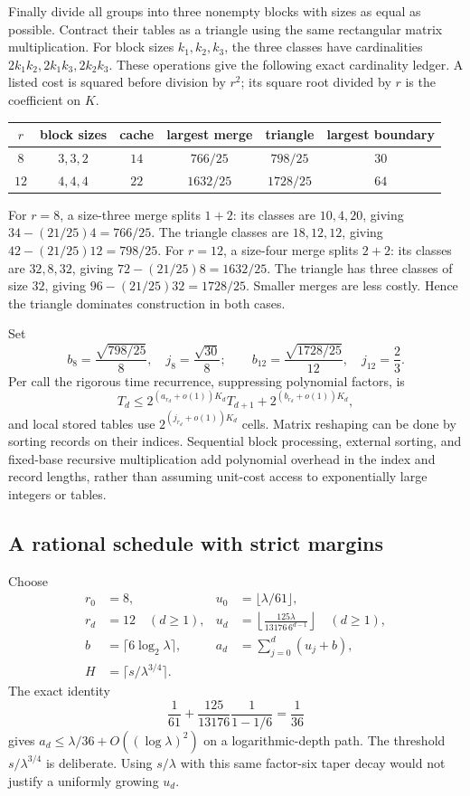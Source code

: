 Finally divide all groups into three nonempty blocks with sizes as equal as possible. Contract their tables as a triangle using the same rectangular matrix multiplication. For block sizes $k_1,k_2,k_3$, the three classes have cardinalities $2k_1k_2,2k_1k_3,2k_2k_3$. These operations give the following exact cardinality ledger. A listed cost is squared before division by $r^2$; its square root divided by $r$ is the coefficient on $K$.
\begin{center}
\begin{tabular}{c|c|c|c|c|c}
$r$&block sizes&cache&largest merge&triangle&largest boundary\\\hline
$8$&$3,3,2$&$14$&$766/25$&$798/25$&$30$\\
$12$&$4,4,4$&$22$&$1632/25$&$1728/25$&$64$
\end{tabular}
\end{center}
For $r=8$, a size-three merge splits $1+2$: its classes are $10,4,20$, giving $34-(21/25)4=766/25$. The triangle classes are $18,12,12$, giving $42-(21/25)12=798/25$. For $r=12$, a size-four merge splits $2+2$: its classes are $32,8,32$, giving $72-(21/25)8=1632/25$. The triangle has three classes of size $32$, giving $96-(21/25)32=1728/25$. Smaller merges are less costly. Hence the triangle dominates construction in both cases.

Set
\[
 b_8=\frac{\sqrt{798/25}}8,\quad j_8=\frac{\sqrt{30}}8;
 \qquad b_{12}=\frac{\sqrt{1728/25}}{12},\quad j_{12}=\frac23.
\]
Per call the rigorous time recurrence, suppressing polynomial factors, is
\begin{equation}\label{eq:tree-recurrence}
 T_d\le 2^{(a_{r_d}+o(1))K_d}T_{d+1}
              +2^{(b_{r_d}+o(1))K_d},
\end{equation}
and local stored tables use $2^{(j_{r_d}+o(1))K_d}$ cells. Matrix reshaping can be done by sorting records on their indices. Sequential block processing, external sorting, and fixed-base recursive multiplication add polynomial overhead in the index and record lengths, rather than assuming unit-cost access to exponentially large integers or tables.

\subsection{A rational schedule with strict margins}
Choose
\begin{align*}
 r_0&=8,&u_0&=\lfloor\lambda/61\rfloor,\\
 r_d&=12\quad(d\ge1),&u_d&=\left\lfloor\frac{125\lambda}{13176\,6^{d-1}}\right\rfloor\quad(d\ge1),\\
 b&=\lceil6\log_2\lambda\rceil,&a_d&=\sum_{j=0}^d(u_j+b),\\
 H&=\lceil s/\lambda^{3/4}\rceil.&&
\end{align*}
The exact identity
\[
 \frac1{61}+\frac{125}{13176}\frac1{1-1/6}=\frac1{36}
\]
gives $a_d\le\lambda/36+O((\log\lambda)^2)$ on a logarithmic-depth path.
The threshold $s/\lambda^{3/4}$ is deliberate. Using $s/\lambda$ with this same factor-six taper decay would not justify a uniformly growing $u_d$.

